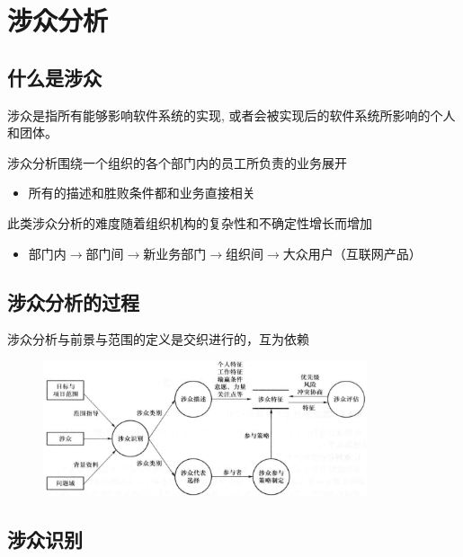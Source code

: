 \section{涉众分析}

\subsection{什么是涉众}
涉众是指所有能够影响软件系统的实现, 或者会被实现后的软件系统所影响的个人和团体。

涉众分析围绕一个组织的各个部门内的员工所负责的业务展开
\begin{itemize}
    \item 所有的描述和胜败条件都和业务直接相关
\end{itemize}

此类涉众分析的难度随着组织机构的复杂性和不确定性增长而增加
\begin{itemize}
    \item 部门内$\rightarrow$部门间$\rightarrow$新业务部门$\rightarrow$组织间$\rightarrow$大众用户（互联网产品）
\end{itemize}


\subsection{涉众分析的过程}
涉众分析与前景与范围的定义是交织进行的，互为依赖
\begin{figure}[H]
	\centering
	\includegraphics[width=0.85\textwidth]{img/涉众分析过程.png}
\end{figure}


\subsection{涉众识别}

